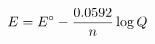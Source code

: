 \documentclass[preview]{standalone}
\begin{document}
\begin{align*}
\special{dvisvgm:raw <g id='unique000'>}E = E^\circ - \frac{0.0592}{n}\log Q\special{dvisvgm:raw </g>}
\end{align*}
\end{document}
